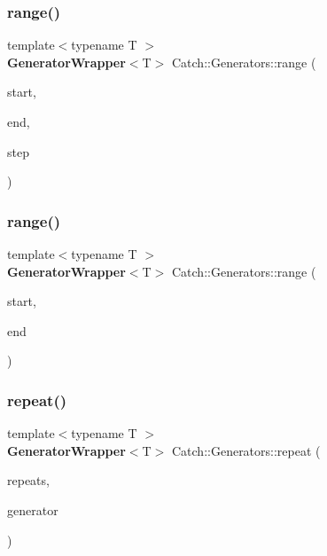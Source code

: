 \mbox{\label{namespace_catch_1_1_generators_a3c79134931f824e63588bfa5baa77a43}} 
\subsubsection{range()\hspace{0.1cm}{\footnotesize\ttfamily [1/2]}}
{\footnotesize\ttfamily template$<$typename T $>$ \\
\textbf{ Generator\+Wrapper}$<$T$>$ Catch\+::\+Generators\+::range (\begin{DoxyParamCaption}\item[{T const \&}]{start,  }\item[{T const \&}]{end,  }\item[{T const \&}]{step }\end{DoxyParamCaption})}

\mbox{\label{namespace_catch_1_1_generators_a75b1b4ab3b52a8d99f9d049824500371}} 
\subsubsection{range()\hspace{0.1cm}{\footnotesize\ttfamily [2/2]}}
{\footnotesize\ttfamily template$<$typename T $>$ \\
\textbf{ Generator\+Wrapper}$<$T$>$ Catch\+::\+Generators\+::range (\begin{DoxyParamCaption}\item[{T const \&}]{start,  }\item[{T const \&}]{end }\end{DoxyParamCaption})}

\mbox{\label{namespace_catch_1_1_generators_a3a30dce0fd8e3818baaca086ba5fd35a}} 
\subsubsection{repeat()}
{\footnotesize\ttfamily template$<$typename T $>$ \\
\textbf{ Generator\+Wrapper}$<$T$>$ Catch\+::\+Generators\+::repeat (\begin{DoxyParamCaption}\item[{size\+\_\+t}]{repeats,  }\item[{\textbf{ Generator\+Wrapper}$<$ T $>$ \&\&}]{generator }\end{DoxyParamCaption})}

